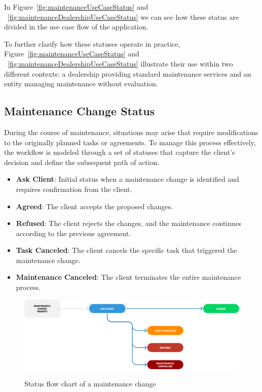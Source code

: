 In Figure~\ref{fig:maintenanceUseCaseStatus} and ~\ref{fig:maintenanceDealershipUseCaseStatus} we can see how these status are divided in the use case flow of the application.

To further clarify how these statuses operate in practice, Figure~\ref{fig:maintenanceUseCaseStatus} and ~\ref{fig:maintenanceDealershipUseCaseStatus} illustrate their use within two different contexts: a dealership providing standard maintenance services and an entity managing maintenance without evaluation.




\subsection{Maintenance Change Status} 

During the course of maintenance, situations may arise that require modifications to the originally planned tasks or agreements. To manage this process effectively, the workflow is modeled through a set of statuses that capture the client's decision and define the subsequent path of action. 

\begin{itemize}
    \item \textbf{Ask Client}: Initial status when a maintenance change is identified and requires confirmation from the client.
    \item \textbf{Agreed}: The client accepts the proposed changes.
    \item \textbf{Refused}: The client rejects the changes, and the maintenance continues according to the previous agreement.
    \item \textbf{Task Canceled}: The client cancels the specific task that triggered the maintenance change.
    \item \textbf{Maintenance Canceled}: The client terminates the entire maintenance process.
\end{itemize}


\begin{figure}[h]
  \caption{Status flow chart of a maintenance change}
  \centering
  \includegraphics[width=\textwidth]{figs/Status/MaintenanceChange/StatusDiagram}
  \label{fig:maintenanceChangeFlowChart}
\end{figure}


